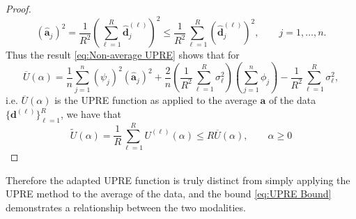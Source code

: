 \documentclass[12pt]{article}
\newcommand{\aVec}{\mathbf{a}}	%
\newcommand{\dVec}{\mathbf{d}}	%
\newcommand{\dft}[1]{\widehat{#1}}	%
\newcommand{\regparam}{\alpha}  %
\newcommand{\filt}{\phi}
\newcommand{\mfilt}{\psi}
\newcommand{\noiseSD}{\sigma}	%
\newcommand{\U}{U}	%
\begin{document}
\begin{proof}
\begin{equation}
\label{eq:Coefficients of Average}
\left(\dft{\aVec}_j\right)^2 = \frac{1}{R^2}\left(\sum_{\ell=1}^R \dft{\dVec}_j^{(\ell)}\right)^2 \leq \frac{1}{R^2} \sum_{\ell=1}^R \left(\dft{\dVec}_j^{(\ell)}\right)^2, \qquad j = 1,\ldots,n.
\end{equation}
Thus the result \eqref{eq:Non-average UPRE} shows that for
\[\overline{U}(\regparam) = \frac{1}{n}\sum_{j=1}^{n} \left(\mfilt_j\right)^2\left(\dft{\aVec}_j\right)^2 + \frac{2}{n} \left(\frac{1}{R^2} \sum_{\ell=1}^R \noiseSD_\ell^2\right) \left(\sum_{j=1}^{n} \filt_j\right) - \frac{1}{R^2} \sum_{\ell=1}^R\noiseSD_\ell^2,\]
i.e. $\overline{U}(\regparam)$ is the UPRE function as applied to the average $\aVec$ of the data $\{\dVec^{(\ell)}\}_{\ell=1}^R$, we have that
\[\widetilde{U}(\regparam) = \frac{1}{R} \sum_{\ell=1}^R \U^{(\ell)}(\regparam) \leq R \overline{U}(\regparam), \qquad \regparam \geq 0\]
\end{proof}
\noindent Therefore the adapted UPRE function is truly distinct from simply applying the UPRE method to the average of the data, and the bound \eqref{eq:UPRE Bound} demonstrates a relationship between the two modalities.
\end{document}
